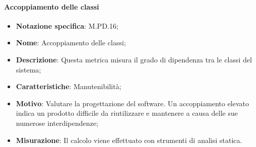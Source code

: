 \paragraph*{Accoppiamento delle classi}
\begin{itemize}
    \item \textbf{Notazione specifica}: M.PD.16;
    \item \textbf{Nome}: Accoppiamento delle classi;
    \item \textbf{Descrizione}: Questa metrica misura il grado di dipendenza tra le classi del sistema;
    \item \textbf{Caratteristiche}: Manutenibilità;
    \item \textbf{Motivo}: Valutare la progettazione del software. Un accoppiamento elevato indica un prodotto difficile da riutilizzare e mantenere a causa delle sue numerose interdipendenze;
    \item \textbf{Misurazione}: Il calcolo viene effettuato con strumenti di analisi statica.
\end{itemize}
